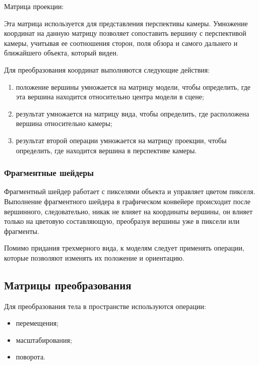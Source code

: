 Матрица проекции:

Эта матрица используется для представления перспективы камеры. Умножение координат на данную матрицу 
позволяет сопоставить вершину с перспективой камеры, учитывая ее соотношения сторон, поля обзора
и самого дальнего и ближайшего объекта, который виден. 

Для преобразования координат выполняются следующие действия:
\begin{enumerate}
  \item положение вершины умножается на матрицу модели, чтобы определить, где эта вершина находится относительно центра модели в сцене;
  \item результат умножается на матрицу вида, чтобы определить, где расположена вершина относительно камеры;
  \item результат второй операции умножается на матрицу проекции, чтобы определить, где находится вершина в перспективе камеры. 
\end{enumerate}
\subsubsection{Фрагментные шейдеры}
Фрагментный шейдер работает с пикселями объекта и управляет цветом пикселя.
Выполнение фрагментного шейдера в графическом конвейере происходит после вершинного, следовательно, никак не влияет на координаты вершины,
он влияет только на цветовую составляющую, преобразуя вершины уже в пиксели или фрагменты.

Помимо придания трехмерного вида, к моделям следует применять операции, 
которые позволяют изменять их положение и ориентацию. 
\subsection{Матрицы преобразования}
Для преобразования тела в пространстве используются операции:
\begin{itemize}
  \item перемещения;
  \item масштабирования;
  \item поворота.
\end{itemize}

